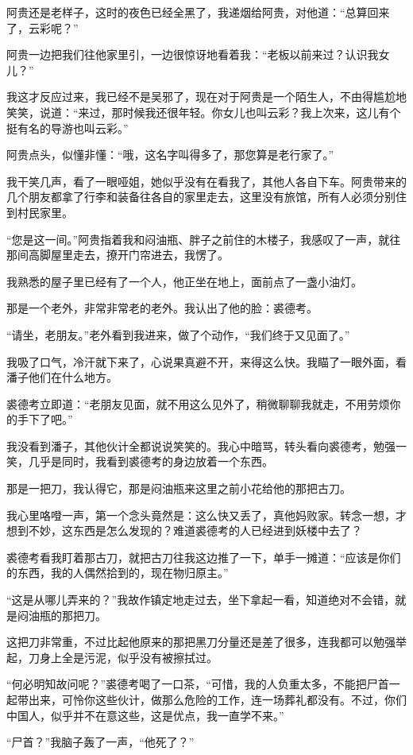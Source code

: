 阿贵还是老样子，这时的夜色已经全黑了，我递烟给阿贵，对他道：“总算回来了，云彩呢？”

阿贵一边把我们往他家里引，一边很惊讶地看着我：“老板以前来过？认识我女儿？”

我这才反应过来，我已经不是吴邪了，现在对于阿贵是一个陌生人，不由得尴尬地笑笑，说道：“来过，那时候我还很年轻。你女儿也叫云彩？我上次来，这儿有个挺有名的导游也叫云彩。”

阿贵点头，似懂非懂：“哦，这名字叫得多了，那您算是老行家了。”

我干笑几声，看了一眼哑姐，她似乎没有在看我了，其他人各自下车。阿贵带来的几个朋友都拿了行李和装备往各自的家里走去，这里没有旅馆，所有人必须分别住到村民家里。

“您是这一间。”阿贵指着我和闷油瓶、胖子之前住的木楼子，我感叹了一声，就往那间高脚屋里走去，撩开门帘进去，我愣了。

我熟悉的屋子里已经有了一个人，他正坐在地上，面前点了一盏小油灯。

那是一个老外，非常非常老的老外。我认出了他的脸：裘德考。

“请坐，老朋友。”老外看到我进来，做了个动作，“我们终于又见面了。”

我吸了口气，冷汗就下来了，心说果真避不开，来得这么快。我瞄了一眼外面，看潘子他们在什么地方。

裘德考立即道：“老朋友见面，就不用这么见外了，稍微聊聊我就走，不用劳烦你的手下了吧。”

我没看到潘子，其他伙计全都说说笑笑的。我心中暗骂，转头看向裘德考，勉强一笑，几乎是同时，我看到裘德考的身边放着一个东西。

那是一把刀，我认得它，那是闷油瓶来这里之前小花给他的那把古刀。

我心里咯噔一声，第一个念头竟然是：这么快又丢了，真他妈败家。转念一想，才想到不妙，这东西是怎么发现的？难道裘德考的人已经进到妖楼中去了？

裘德考看我盯着那古刀，就把古刀往我这边推了一下，单手一摊道：“应该是你们的东西，我的人偶然拾到的，现在物归原主。”

“这是从哪儿弄来的？”我故作镇定地走过去，坐下拿起一看，知道绝对不会错，就是闷油瓶的那把刀。

这把刀非常重，不过比起他原来的那把黑刀分量还是差了很多，连我都可以勉强举起，刀身上全是污泥，似乎没有被擦拭过。

“何必明知故问呢？”裘德考喝了一口茶，“可惜，我的人负重太多，不能把尸首一起带出来，可怜你这些伙计，做那么危险的工作，连一场葬礼都没有。不过，你们中国人，似乎并不在意这些，这是优点，我一直学不来。”

“尸首？”我脑子轰了一声，“他死了？”

